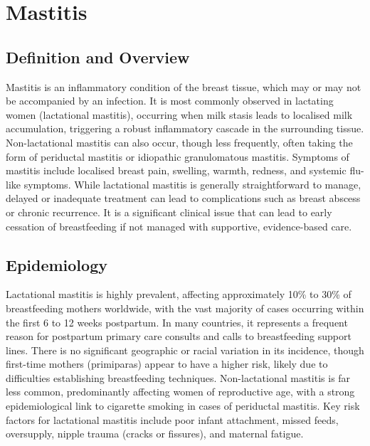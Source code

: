 \chapter{Mastitis}

\section*{Definition and Overview}
Mastitis is an inflammatory condition of the breast tissue, which may or may not be accompanied by an infection. It is most commonly observed in lactating women (lactational mastitis), occurring when milk stasis leads to localised milk accumulation, triggering a robust inflammatory cascade in the surrounding tissue. Non-lactational mastitis can also occur, though less frequently, often taking the form of periductal mastitis or idiopathic granulomatous mastitis. Symptoms of mastitis include localised breast pain, swelling, warmth, redness, and systemic flu-like symptoms. While lactational mastitis is generally straightforward to manage, delayed or inadequate treatment can lead to complications such as breast abscess or chronic recurrence. It is a significant clinical issue that can lead to early cessation of breastfeeding if not managed with supportive, evidence-based care.

\section*{Epidemiology}
Lactational mastitis is highly prevalent, affecting approximately 10\% to 30\% of breastfeeding mothers worldwide, with the vast majority of cases occurring within the first 6 to 12 weeks postpartum. In many countries, it represents a frequent reason for postpartum primary care consults and calls to breastfeeding support lines. There is no significant geographic or racial variation in its incidence, though first-time mothers (primiparas) appear to have a higher risk, likely due to difficulties establishing breastfeeding techniques. Non-lactational mastitis is far less common, predominantly affecting women of reproductive age, with a strong epidemiological link to cigarette smoking in cases of periductal mastitis. Key risk factors for lactational mastitis include poor infant attachment, missed feeds, oversupply, nipple trauma (cracks or fissures), and maternal fatigue.


